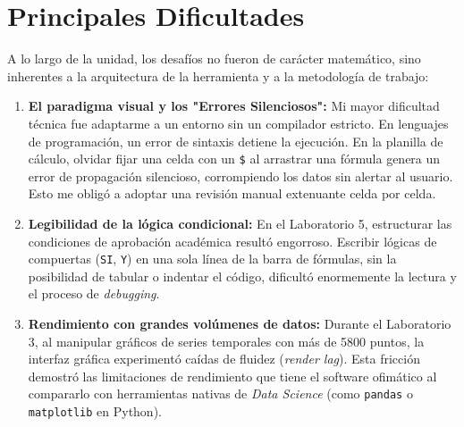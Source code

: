 

\newpage

\section{Principales Dificultades}

A lo largo de la unidad, los desafíos no fueron de carácter matemático, sino inherentes a la arquitectura de la herramienta y a la metodología de trabajo:

\begin{enumerate}
	\item \textbf{El paradigma visual y los "Errores Silenciosos":} Mi mayor dificultad técnica fue adaptarme a un entorno sin un compilador estricto. En lenguajes de programación, un error de sintaxis detiene la ejecución. En la planilla de cálculo, olvidar fijar una celda con un \texttt{\$} al arrastrar una fórmula genera un error de propagación silencioso, corrompiendo los datos sin alertar al usuario. Esto me obligó a adoptar una revisión manual extenuante celda por celda.

	\item \textbf{Legibilidad de la lógica condicional:} En el Laboratorio 5, estructurar las condiciones de aprobación académica resultó engorroso. Escribir lógicas de compuertas (\texttt{SI}, \texttt{Y}) en una sola línea de la barra de fórmulas, sin la posibilidad de tabular o indentar el código, dificultó enormemente la lectura y el proceso de \textit{debugging}.

	\item \textbf{Rendimiento con grandes volúmenes de datos:} Durante el Laboratorio 3, al manipular gráficos de series temporales con más de 5800 puntos, la interfaz gráfica experimentó caídas de fluidez (\textit{render lag}). Esta fricción demostró las limitaciones de rendimiento que tiene el software ofimático al compararlo con herramientas nativas de \textit{Data Science} (como \texttt{pandas} o \texttt{matplotlib} en Python).
\end{enumerate}

